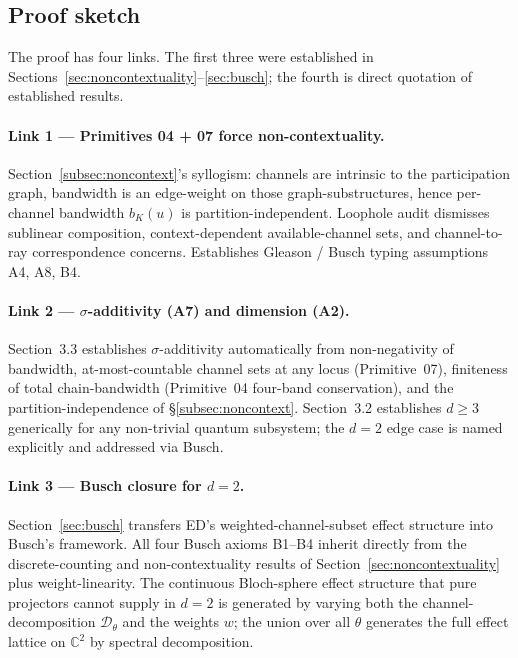 \documentclass[11pt,a4paper]{article}
\begin{document}
\subsection{Proof sketch}

The proof has four links. The first three were established in Sections~\ref{sec:noncontextuality}--\ref{sec:busch}; the fourth is direct quotation of established results.

\paragraph{Link 1 --- Primitives 04 + 07 force non-contextuality.} Section~\ref{subsec:noncontext}'s syllogism: channels are intrinsic to the participation graph, bandwidth is an edge-weight on those graph-substructures, hence per-channel bandwidth $b_K(u)$ is partition-independent. Loophole audit dismisses sublinear composition, context-dependent available-channel sets, and channel-to-ray correspondence concerns. Establishes Gleason / Busch typing assumptions A4, A8, B4.

\paragraph{Link 2 --- $\sigma$-additivity (A7) and dimension (A2).} Section~3.3 establishes $\sigma$-additivity automatically from non-negativity of bandwidth, at-most-countable channel sets at any locus (Primitive~07), finiteness of total chain-bandwidth (Primitive~04 four-band conservation), and the partition-independence of \S\ref{subsec:noncontext}. Section~3.2 establishes $d \geq 3$ generically for any non-trivial quantum subsystem; the $d = 2$ edge case is named explicitly and addressed via Busch.

\paragraph{Link 3 --- Busch closure for $d = 2$.} Section~\ref{sec:busch} transfers ED's weighted-channel-subset effect structure into Busch's framework. All four Busch axioms B1--B4 inherit directly from the discrete-counting and non-contextuality results of Section~\ref{sec:noncontextuality} plus weight-linearity. The continuous Bloch-sphere effect structure that pure projectors cannot supply in $d = 2$ is generated by varying both the channel-decomposition $\mathcal{D}_\theta$ and the weights $w$; the union over all $\theta$ generates the full effect lattice on $\mathbb{C}^2$ by spectral decomposition.
\end{document}
